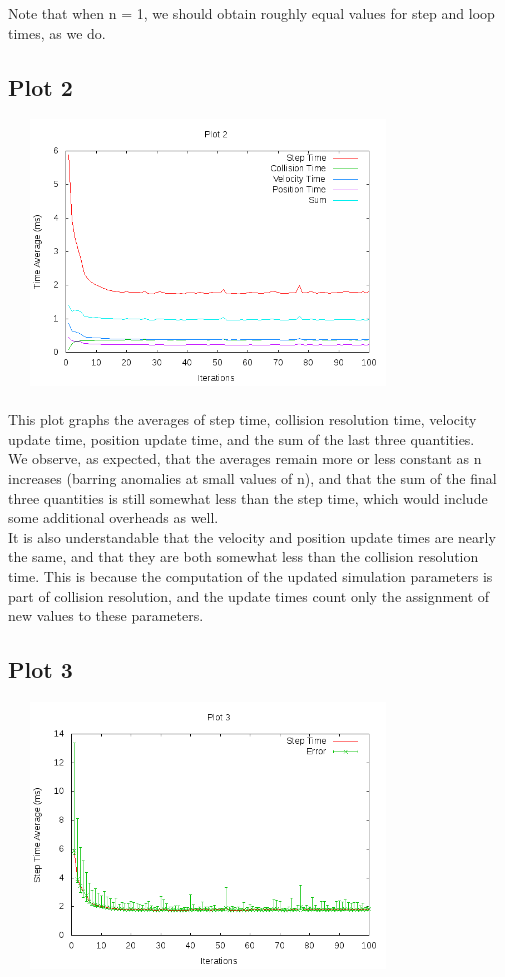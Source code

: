 \documentclass[11pt]{article}
\begin{document}
	Note that when n = 1, we should obtain roughly equal values for step and loop times, as we do.

\subsection{Plot 2}

	\includegraphics[width=300pt, height=200pt]{../plots/plot2.png}\\\\

	This plot graphs the averages of step time, collision resolution time, velocity update time, position update time, and the sum of the last three quantities.\\

	We observe, as expected, that the averages remain more or less constant as n increases (barring anomalies at small values of n), and that the sum of the final three quantities is still somewhat less than the step time, which would include some additional overheads as well.\\

	It is also understandable that the velocity and position update times are nearly the same, and that they are both somewhat less than the collision resolution time. This is because the computation of the updated simulation parameters is part of collision resolution, and the update times count only the assignment of new values to these parameters.

\subsection{Plot 3}

	\includegraphics[width=300pt, height=200pt]{../plots/plot3.png}\\\\
\end{document}
